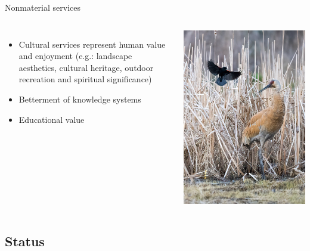 \documentclass[
  ignorenonframetext,
  aspectratio=169]{beamer}
\providecommand{\tightlist}{%
  \setlength{\itemsep}{0pt}\setlength{\parskip}{0pt}}
\newcommand{\bcolumns}{\begin{columns}[T, onlytextwidth]}
\newcommand{\ecolumns}{\end{columns}}
\begin{document}
\begin{frame}{Nonmaterial services}
\protect\hypertarget{nonmaterial-services}{}
\bcolumns


\begin{itemize}
\tightlist
\item
  Cultural services represent human value and enjoyment (e.g.: landscape
  aesthetics, cultural heritage, outdoor recreation and spiritual
  significance)
\item
  Betterment of knowledge systems
\item
  Educational value
\end{itemize}


\begin{center}\includegraphics[width=0.62\linewidth]{../images/swan_and_birds} \end{center}

\ecolumns
\end{frame}

\hypertarget{status}{%
\subsection{Status}\label{status}}
\end{document}
